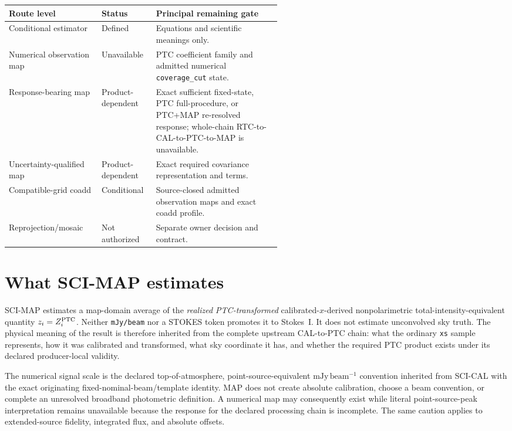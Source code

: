 \documentclass[10pt]{article}
\newcommand{\code}[1]{\nolinkurl{#1}}
\newcommand{\mjybeam}{\mathrm{mJy\,beam^{-1}}}
\begin{document}
\begin{center}\small
\begin{tabularx}{0.96\linewidth}{@{}L{0.34\linewidth}L{0.20\linewidth}Y@{}}
\toprule Route level & Status & Principal remaining gate \\
\midrule
Conditional estimator & Defined & Equations and scientific meanings only.\\
Numerical observation map & Unavailable & PTC coefficient family and admitted numerical \code{coverage_cut} state.\\
Response-bearing map & Product-dependent & Exact sufficient fixed-state, PTC full-procedure, or PTC+MAP re-resolved response; whole-chain RTC-to-CAL-to-PTC-to-MAP is unavailable.\\
Uncertainty-qualified map & Product-dependent & Exact required covariance representation and terms.\\
Compatible-grid coadd & Conditional & Source-closed admitted observation maps and exact coadd profile.\\
Reprojection/mosaic & Not authorized & Separate owner decision and contract.\\
\bottomrule
\end{tabularx}
\end{center}

\tableofcontents

\clearpage
\section{What SCI-MAP estimates}\label{sec:estimand}
SCI-MAP estimates a map-domain average of the \emph{realized PTC-transformed}
calibrated-\(x\)-derived nonpolarimetric total-intensity-equivalent quantity
\(z_i=Z_i^{\rm PTC}\). Neither \code{mJy/beam} nor a STOKES token promotes it
to Stokes~I. It does not estimate unconvolved sky truth. The physical
meaning of the result is therefore inherited from the complete upstream
CAL-to-PTC chain: what the ordinary \code{xs} sample represents, how it was
calibrated and transformed, what sky coordinate it has, and whether the
required PTC product exists under its declared producer-local validity.

The numerical signal scale is the declared top-of-atmosphere,
point-source-equivalent \(\mjybeam\) convention inherited from SCI-CAL with
the exact originating fixed-nominal-beam/template identity. MAP does not create absolute
calibration, choose a beam convention, or complete an unresolved broadband
photometric definition. A numerical map may consequently exist while literal
point-source-peak interpretation remains unavailable because the response for
the declared processing chain is incomplete. The same caution applies to
extended-source fidelity, integrated flux, and absolute offsets.
\end{document}
